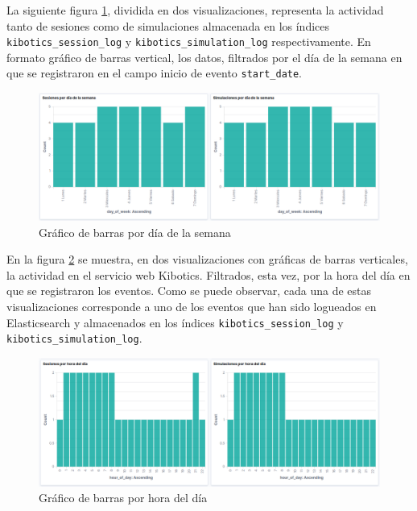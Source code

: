\documentclass[11pt,a4paper]{book}
\begin{document}
				La siguiente figura \ref{fig:kibana_dayofweek}, dividida en dos visualizaciones, representa la actividad tanto de sesiones como de simulaciones almacenada en los índices \texttt{kibotics\_session\_log} y \texttt{kibotics\_simulation\_log} respectivamente. En formato gráfico de barras vertical, los datos, filtrados por el día de la semana en que se registraron en el campo inicio de evento \texttt{start\_date}. \\
				
				\begin{figure}[H]
					\centering
					\includegraphics[width=14cm, keepaspectratio]{img/kibana_03_day_of_week}
					\caption{Gráfico de barras por día de la semana}
					\label{fig:kibana_dayofweek}
				\end{figure}

				En la figura \ref{fig:kibana_hourofday} se muestra, en dos visualizaciones con gráficas de barras verticales, la actividad en el servicio web Kibotics. Filtrados, esta vez, por la hora del día en que se registraron los eventos. Como se puede observar, cada una de estas visualizaciones corresponde a uno de los eventos que han sido logueados en Elasticsearch y almacenados en los índices \texttt{kibotics\_session\_log} y \texttt{kibotics\_simulation\_log}.\\
				
				\begin{figure}[H]
					\centering
					\includegraphics[width=14cm, keepaspectratio]{img/kibana_04_hour_of_day}
					\caption{Gráfico de barras por hora del día}
					\label{fig:kibana_hourofday}
				\end{figure}
\newpage		
				
\end{document}
